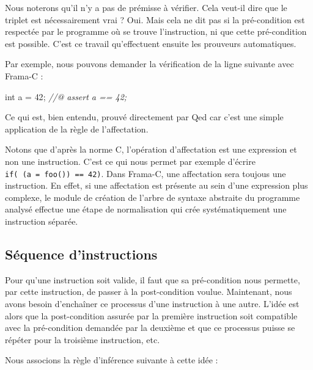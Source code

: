\documentclass[12pt,francais,]{scrbook}
\newenvironment{Shaded}{}{}
\newcommand{\DataTypeTok}[1]{\textcolor[rgb]{0.56,0.13,0.00}{{#1}}}
\newcommand{\DecValTok}[1]{\textcolor[rgb]{0.25,0.63,0.44}{{#1}}}
\newcommand{\CommentTok}[1]{\textcolor[rgb]{0.38,0.63,0.69}{\textit{{#1}}}}
\newcommand{\NormalTok}[1]{{#1}}
\newenvironment{zdsblock}[1]{%
  \tcolorbox[beamer,%
    noparskip,breakable,
    colback=LightBlue,colframe=DarkBlue,%
    colbacklower=DarkBlue,%
    title=#1]
}{\endtcolorbox}
\begin{document}
Nous noterons qu'il n'y a pas de prémisse à vérifier. Cela veut-il dire
que le triplet est nécessairement vrai ? Oui. Mais cela ne dit pas si la
pré-condition est respectée par le programme où se trouve l'instruction,
ni que cette pré-condition est possible. C'est ce travail qu'effectuent
ensuite les prouveurs automatiques.

Par exemple, nous pouvons demander la vérification de la ligne suivante
avec Frama-C :

\begin{footnotesize}\begin{Shaded}
\begin{Highlighting}[]
\DataTypeTok{int} \NormalTok{a = }\DecValTok{42}\NormalTok{;}
\CommentTok{//@ assert a == 42;}
\end{Highlighting}
\end{Shaded}\end{footnotesize}

Ce qui est, bien entendu, prouvé directement par Qed car c'est une
simple application de la règle de l'affectation.

\begin{zdsblock}{Information}
  Notons que d'après la norme C,
  l'opération d'affectation est une expression et non une
  instruction. C'est ce qui nous permet par exemple d'écrire
  \texttt{if(\ (a\ =\ foo())\ ==\ 42)}. Dans Frama-C, une affectation sera
  toujous une instruction. En effet, si une affectation est
  présente au sein d'une expression plus complexe, le module de
  création de l'arbre de syntaxe abstraite du programme analysé
  effectue une étape de normalisation qui crée systématiquement
  une instruction séparée.
\end{zdsblock}

\subsection{Séquence d'instructions}\label{suxe9quence-dinstructions}

Pour qu'une instruction soit valide, il faut que sa pré-condition nous
permette, par cette instruction, de passer à la post-condition voulue.
Maintenant, nous avons besoin d'enchaîner ce processus d'une instruction
à une autre. L'idée est alors que la post-condition assurée par la
première instruction soit compatible avec la pré-condition demandée par
la deuxième et que ce processus puisse se répéter pour la troisième
instruction, etc.

Nous associons la règle d'inférence suivante à cette idée :
\end{document}
